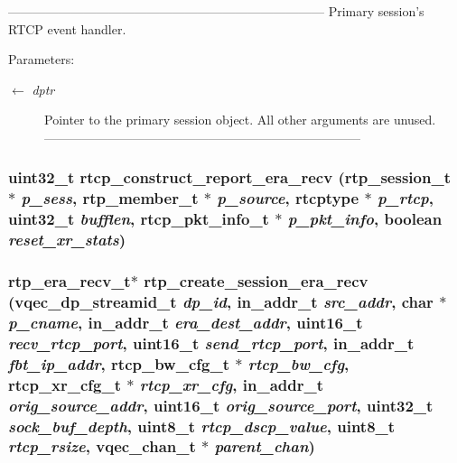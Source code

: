 --------------------------------------------------------------------------- Primary session's RTCP event handler.

\begin{Desc}
\item[Parameters:]
\begin{description}
\item[\mbox{$\leftarrow$} {\em dptr}]Pointer to the primary session object. All other arguments are unused. --------------------------------------------------------------------------- \end{description}
\end{Desc}
\subsubsection{\setlength{\rightskip}{0pt plus 5cm}uint32\_\-t rtcp\_\-construct\_\-report\_\-era\_\-recv (rtp\_\-session\_\-t $\ast$ {\em p\_\-sess}, rtp\_\-member\_\-t $\ast$ {\em p\_\-source}, rtcptype $\ast$ {\em p\_\-rtcp}, uint32\_\-t {\em bufflen}, rtcp\_\-pkt\_\-info\_\-t $\ast$ {\em p\_\-pkt\_\-info}, boolean {\em reset\_\-xr\_\-stats})}\label{rtp__era__recv_8c_774bed7d45489c2375da8625b14c1cbf}


\subsubsection{\setlength{\rightskip}{0pt plus 5cm}\bf{rtp\_\-era\_\-recv\_\-t}$\ast$ rtp\_\-create\_\-session\_\-era\_\-recv (vqec\_\-dp\_\-streamid\_\-t {\em dp\_\-id}, in\_\-addr\_\-t {\em src\_\-addr}, char $\ast$ {\em p\_\-cname}, in\_\-addr\_\-t {\em era\_\-dest\_\-addr}, uint16\_\-t {\em recv\_\-rtcp\_\-port}, uint16\_\-t {\em send\_\-rtcp\_\-port}, in\_\-addr\_\-t {\em fbt\_\-ip\_\-addr}, rtcp\_\-bw\_\-cfg\_\-t $\ast$ {\em rtcp\_\-bw\_\-cfg}, rtcp\_\-xr\_\-cfg\_\-t $\ast$ {\em rtcp\_\-xr\_\-cfg}, in\_\-addr\_\-t {\em orig\_\-source\_\-addr}, uint16\_\-t {\em orig\_\-source\_\-port}, uint32\_\-t {\em sock\_\-buf\_\-depth}, uint8\_\-t {\em rtcp\_\-dscp\_\-value}, uint8\_\-t {\em rtcp\_\-rsize}, \bf{vqec\_\-chan\_\-t} $\ast$ {\em parent\_\-chan})}\label{rtp__era__recv_8c_8ce839b892aa2a68c5fe31a32c050ca1}


